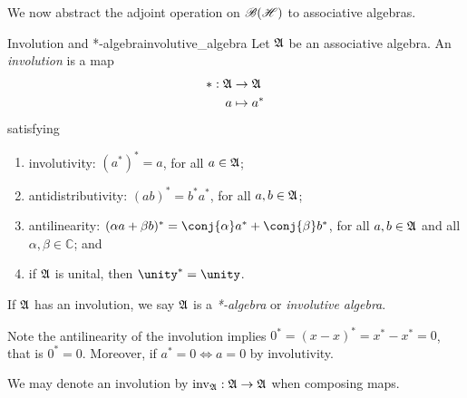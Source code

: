 We now abstract the adjoint operation on \(\mathscr{B}(\mathscr{H})\) to associative algebras.
\begin{definition}{Involution and *-algebra}{involutive_algebra}
    Let \(\mathfrak{A}\) be an associative algebra. An \emph{involution} is a map
    \begin{align*}
        * : \mathfrak{A} &\to \mathfrak{A}\\
                      a &\mapsto a^*
    \end{align*}
    satisfying
    \begin{enumerate}[label=(\alph*)]
        \item involutivity: \((a^*)^* = a\), for all \(a \in \mathfrak{A}\);
        \item antidistributivity: \((ab)^* = b^* a^*\), for all \(a, b \in \mathfrak{A}\);
        \item antilinearity: \((\alpha a + \beta b)^* = \conj{\alpha}a^* + \conj{\beta}b^*\), for all \(a,b \in \mathfrak{A}\) and all \(\alpha, \beta \in \mathbb{C}\); and
        \item if \(\mathfrak{A}\) is unital, then \(\unity^* = \unity\).
    \end{enumerate}
    If \(\mathfrak{A}\) has an involution, we say \(\mathfrak{A}\) is a \emph{*-algebra} or \emph{involutive algebra}.
\end{definition}
\begin{remark}
    Note the antilinearity of the involution implies \(0^* = (x-x)^* = x^* - x^* = 0\), that is \(0^* = 0\). Moreover, if \(a^* = 0 \iff a = 0\) by involutivity.
\end{remark}
\begin{remark}
    We may denote an involution by \(\operatorname{inv}_{\mathfrak{A}} : \mathfrak{A} \to \mathfrak{A}\) when composing maps.
\end{remark}

